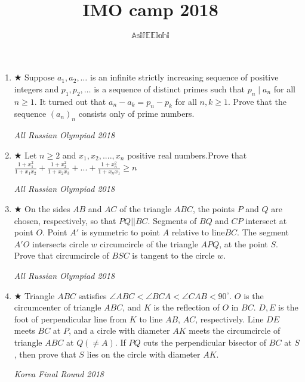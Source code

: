 \documentclass[12pt]{article}
\title{{\Huge IMO camp 2018}}
\author{$\mathbb{Asif E Elahi}$}
\begin{document}
	\maketitle
	\begin{enumerate}
		\item $ \bigstar $ Suppose $a_1,a_2, \dots$ is an infinite strictly increasing sequence of positive integers and $p_1, p_2, \dots$ is a sequence of distinct primes such that $p_n \mid a_n$ for all $n \ge 1$. It turned out that $a_n-a_k=p_n-p_k$ for all $n,k \ge 1$. Prove that the sequence $(a_n)_n$ consists only of prime numbers.
		\begin{flushright} \textit{All Russian Olympiad 2018}\end{flushright}
		
		\item $ \bigstar $ Let $n\geq 2$ and $x_{1},x_{2},....,x_{n}$ positive real numbers.Prove that
		$\frac{1+x_{1}^2}{1+x_{1}x_{2}}+\frac{1+x_{2}^2}{1+x_{2}x_{3}}+...+\frac{1+x_{n}^2}{1+x_{n}x_{1}}\geq n$
		\begin{flushright}\textit{All Russian Olympiad 2018}\end{flushright}
		
		\item $ \bigstar $ On the sides $AB$ and $AC$ of the triangle $ABC$, the points $P$ and $Q$ are chosen, respectively, so that $PQ||BC$. Segments of $BQ$
		and $CP$ intersect at point $O$. Point $A'$ is symmetric to point $A$ relative to line$ BC$. The segment $A'O$ intersects
		circle $w$ circumcircle of the triangle $APQ$, at the point $S$.
		Prove that circumcircle of $BSC$ is tangent to the circle $w$.
		\begin{flushright}\textit{All Russian Olympiad 2018}\end{flushright}
		
		\item $ \bigstar $ Triangle $ABC$ satisfies $\angle ABC < \angle BCA < \angle CAB < 90^{\circ}$. $O$ is the circumcenter of triangle $ABC$, and $K$ is the reflection of $O$ in $BC$. $D,E$ is the foot of perpendicular line from $K$ to line $AB$, $AC$, respectively. Line $DE$ meets $BC$ at $P$, and a circle with diameter $AK$ meets the circumcircle of triangle $ABC$ at $Q(\neq A)$. If $PQ$ cuts the perpendicular bisector of $BC$ at $S$, then prove that $S$ lies on the circle with diameter $AK$.
		\begin{flushright}\textit{Korea Final Round 2018}\end{flushright}
		

\end{enumerate}
\end{document}
